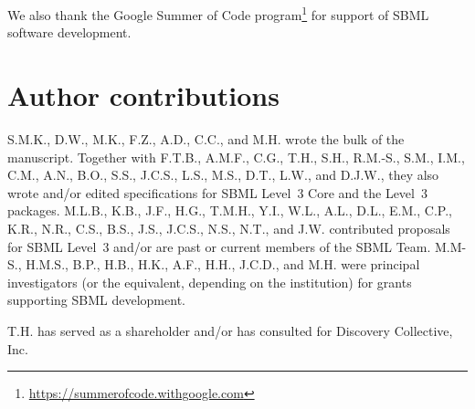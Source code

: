 \documentclass{sbml-paper}
\begin{document}
We also thank the Google Summer of Code program\footnote{\url{https://summerofcode.withgoogle.com}} for support of SBML software development.


\section*{Author contributions}

S.M.K., D.W., M.K., F.Z., A.D., C.C., and M.H. wrote the bulk of the manuscript.  Together with F.T.B., A.M.F., C.G., T.H., S.H., R.M.-S., S.M., I.M., C.M., A.N., B.O., S.S., J.C.S., L.S., M.S., D.T., L.W., and D.J.W., they also wrote and/or edited specifications for SBML Level~3 Core and the Level~3 packages.  M.L.B., K.B., J.F., H.G., T.M.H., Y.I., W.L., A.L., D.L., E.M., C.P., K.R., N.R., C.S., B.S., J.S., J.C.S., N.S., N.T., and J.W. contributed proposals for SBML Level~3 and/or are past or current members of the SBML Team.  M.M-S., H.M.S., B.P., H.B., H.K., A.F., H.H., J.C.D., and M.H. were principal investigators (or the equivalent, depending on the institution) for grants supporting SBML development.

T.H. has served as a shareholder and/or has consulted for Discovery Collective, Inc.

\clearpage



\end{document}
